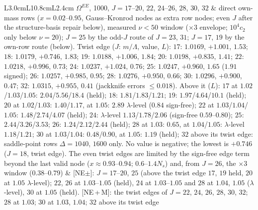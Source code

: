 \documentclass[aps,prl,onecolumn,superscriptaddress,nofootinbib]{revtex4-2}
\begin{document}
\begin{table}[!htbp]
\begin{ruledtabular}
\begin{tabular}{L{3.0cm}L{10.8cm}L{2.4cm}}
$\Omega^{EE}$, 1000, $J=17$--$20$, $22$, $24$--$26$, $28$, $30$, $32$ & direct own-mass rows ($x=0.02$--$0.95$, Gauss--Kronrod nodes as extra row nodes; even $J$ after the structure-basis repair below), measured $\nu<50$ window ($\times3$ envelope; $10^4c_2$ only below $\nu=20$); $J=25$ by the odd-$J$ route of $J=23$, $31$; $J=17$, $19$ by the own-row route (below). Twist edge ($J$: $m/\Lambda$, value, $L$): $17$: $1.0169$, $+1.001$, $1.53$; $18$: $1.0179$, $+0.746$, $1.83$; $19$: $1.0188$, $+1.006$, $1.84$; $20$: $1.0198$, $+0.835$, $1.41$; $22$: $1.0218$, $+0.996$, $0.73$; $24$: $1.0237$, $+1.024$, $0.76$; $25$: $1.0247$, $+0.960$, $1.65$ ($1.91$ signed); $26$: $1.0257$, $+0.985$, $0.95$; $28$: $1.0276$, $+0.950$, $0.66$; $30$: $1.0296$, $+0.900$, $0.47$; $32$: $1.0315$, $+0.955$, $0.41$ (jackknife errors $\le0.018$). Above it ($L$): $17$ at $1.02$/$1.03$/$1.05$: $2.04$/$5.56$/$18.4$ (held); $18$: $1.81$/$1.83$/$1.21$; $19$: $1.97$/$4.64$/$10.1$ (held); $20$ at $1.02$/$1.03$: $1.40$/$1.17$, at $1.05$: $2.89$ $\lambda$-level ($0.84$ sign-free); $22$ at $1.03$/$1.04$/$1.05$: $1.48$/$2.74$/$4.07$ (held); $24$: $\lambda$-level $1.13$/$1.78$/$2.06$ (sign-free $0.59$--$0.80$); $25$: $2.44$/$3.26$/$3.53$; $26$: $1.24$/$2.12$/$2.44$ (held); $28$ at $1.03$: $0.65$, at $1.04$/$1.05$: $\lambda$-level $1.18$/$1.21$; $30$ at $1.03$/$1.04$: $0.48$/$0.90$, at $1.05$: $1.19$ (held); $32$ above its twist edge: saddle-point rows $\Delta=1040$, $1600$ only. No value is negative; the lowest is $+0.746$ ($J=18$, twist edge). The even twist edges are limited by the sign-free edge term beyond the last valid node ($x\approx0.93$--$0.94$; $0.6$--$1.4N_s$) and, from $J=26$, the $\times3$ window ($0.38$--$0.79$) & [NE$\pm$]: $J=17$--$20$, $25$ (above the twist edge $17$, $19$ held, $20$ at $1.05$ $\lambda$-level); $22$, $26$ at $1.03$--$1.05$ (held), $24$ at $1.03$--$1.05$ and $28$ at $1.04$, $1.05$ ($\lambda$-level), $30$ at $1.05$ (held). [NE\,+\,M]: the twist edges of $J=22$, $24$, $26$, $28$, $30$, $32$; $28$ at $1.03$; $30$ at $1.03$, $1.04$; $32$ above its twist edge\\
\end{tabular}
\end{ruledtabular}
\end{table}
\end{document}
